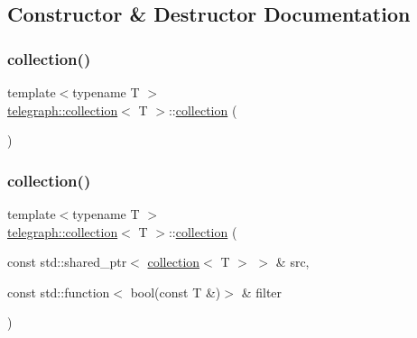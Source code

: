 \subsection{Constructor \& Destructor Documentation}
\mbox{\label{classtelegraph_1_1collection_a226e589bb9d07937a82843f5da0610a0}} 
\subsubsection{\texorpdfstring{collection()}{collection()}\hspace{0.1cm}{\footnotesize\ttfamily [1/2]}}
{\footnotesize\ttfamily template$<$typename T $>$ \\
\hyperlink{classtelegraph_1_1collection}{telegraph\+::collection}$<$ T $>$\+::\hyperlink{classtelegraph_1_1collection}{collection} (\begin{DoxyParamCaption}{ }\end{DoxyParamCaption})\hspace{0.3cm}{\ttfamily [inline]}}

\mbox{\label{classtelegraph_1_1collection_a4ce0e224a982a6025015a1ef7008ca56}} 
\subsubsection{\texorpdfstring{collection()}{collection()}\hspace{0.1cm}{\footnotesize\ttfamily [2/2]}}
{\footnotesize\ttfamily template$<$typename T $>$ \\
\hyperlink{classtelegraph_1_1collection}{telegraph\+::collection}$<$ T $>$\+::\hyperlink{classtelegraph_1_1collection}{collection} (\begin{DoxyParamCaption}\item[{const std\+::shared\+\_\+ptr$<$ \hyperlink{classtelegraph_1_1collection}{collection}$<$ T $>$ $>$ \&}]{src,  }\item[{const std\+::function$<$ bool(const T \&)$>$ \&}]{filter }\end{DoxyParamCaption})\hspace{0.3cm}{\ttfamily [inline]}}



